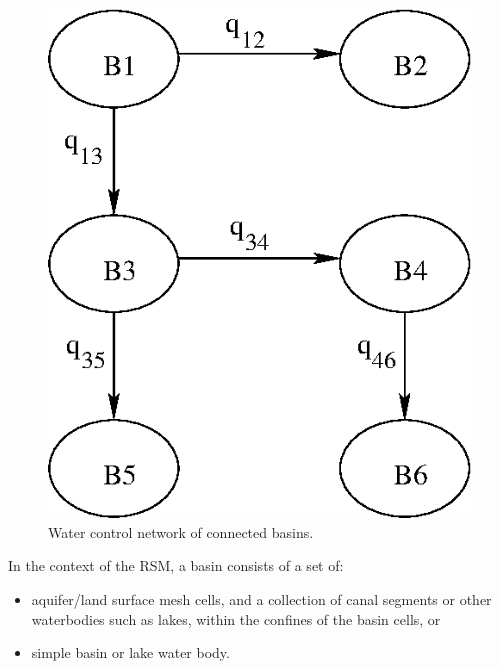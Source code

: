 \begin{figure}
 \begin{center}
  \includegraphics[scale=.75]{Graphics/connectedBasins.eps}
 \end{center}
 \caption{\label{fig:connectedBasins} Water control network of connected basins.}
\end{figure}

In the context of the RSM, a basin consists of a set of:
\begin{itemize}
 \item aquifer/land surface mesh cells, and a collection of canal
   segments or other waterbodies such as lakes, within the confines of
   the basin cells, or
 \item simple basin or lake water body.
\end{itemize}

